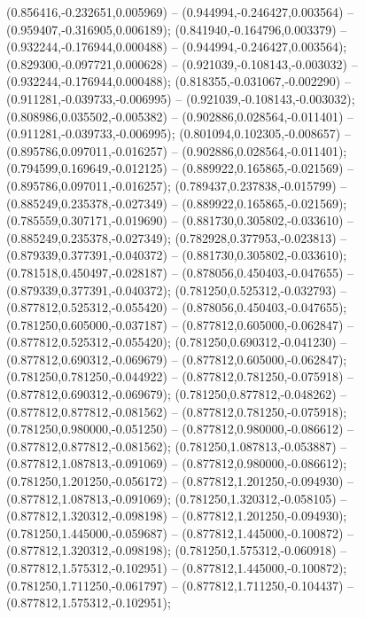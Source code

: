  (0.856416,-0.232651,0.005969) -- (0.944994,-0.246427,0.003564) -- (0.959407,-0.316905,0.006189);
 (0.841940,-0.164796,0.003379) -- (0.932244,-0.176944,0.000488) -- (0.944994,-0.246427,0.003564);
 (0.829300,-0.097721,0.000628) -- (0.921039,-0.108143,-0.003032) -- (0.932244,-0.176944,0.000488);
 (0.818355,-0.031067,-0.002290) -- (0.911281,-0.039733,-0.006995) -- (0.921039,-0.108143,-0.003032);
 (0.808986,0.035502,-0.005382) -- (0.902886,0.028564,-0.011401) -- (0.911281,-0.039733,-0.006995);
 (0.801094,0.102305,-0.008657) -- (0.895786,0.097011,-0.016257) -- (0.902886,0.028564,-0.011401);
 (0.794599,0.169649,-0.012125) -- (0.889922,0.165865,-0.021569) -- (0.895786,0.097011,-0.016257);
 (0.789437,0.237838,-0.015799) -- (0.885249,0.235378,-0.027349) -- (0.889922,0.165865,-0.021569);
 (0.785559,0.307171,-0.019690) -- (0.881730,0.305802,-0.033610) -- (0.885249,0.235378,-0.027349);
 (0.782928,0.377953,-0.023813) -- (0.879339,0.377391,-0.040372) -- (0.881730,0.305802,-0.033610);
 (0.781518,0.450497,-0.028187) -- (0.878056,0.450403,-0.047655) -- (0.879339,0.377391,-0.040372);
 (0.781250,0.525312,-0.032793) -- (0.877812,0.525312,-0.055420) -- (0.878056,0.450403,-0.047655);
 (0.781250,0.605000,-0.037187) -- (0.877812,0.605000,-0.062847) -- (0.877812,0.525312,-0.055420);
 (0.781250,0.690312,-0.041230) -- (0.877812,0.690312,-0.069679) -- (0.877812,0.605000,-0.062847);
 (0.781250,0.781250,-0.044922) -- (0.877812,0.781250,-0.075918) -- (0.877812,0.690312,-0.069679);
 (0.781250,0.877812,-0.048262) -- (0.877812,0.877812,-0.081562) -- (0.877812,0.781250,-0.075918);
 (0.781250,0.980000,-0.051250) -- (0.877812,0.980000,-0.086612) -- (0.877812,0.877812,-0.081562);
 (0.781250,1.087813,-0.053887) -- (0.877812,1.087813,-0.091069) -- (0.877812,0.980000,-0.086612);
 (0.781250,1.201250,-0.056172) -- (0.877812,1.201250,-0.094930) -- (0.877812,1.087813,-0.091069);
 (0.781250,1.320312,-0.058105) -- (0.877812,1.320312,-0.098198) -- (0.877812,1.201250,-0.094930);
 (0.781250,1.445000,-0.059687) -- (0.877812,1.445000,-0.100872) -- (0.877812,1.320312,-0.098198);
 (0.781250,1.575312,-0.060918) -- (0.877812,1.575312,-0.102951) -- (0.877812,1.445000,-0.100872);
 (0.781250,1.711250,-0.061797) -- (0.877812,1.711250,-0.104437) -- (0.877812,1.575312,-0.102951);
